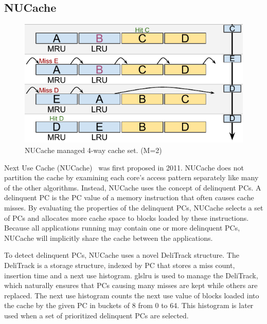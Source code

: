 
\subsection{NUCache}
\label{sec:algorithms:nucache}

\begin{figure}[ht]
    \centering
    \includegraphics[width=.65\textwidth]{figures/algorithms/NUCache}
    \caption[NUCache managed 4-way cache set.]{NUCache managed 4-way cache set. (M=2)}
    \label{fig:algorithms:nucache_example}
\end{figure}

Next Use Cache (NUCache)~\cite{Manikantan2011} was first proposed in 2011.
NUCache does not partition the cache by examining each core's access pattern separately like many of the other algorithms. 
Instead, NUCache uses the concept of delinquent PCs.
A delinquent PC is the PC value of a memory instruction that often causes cache misses.
By evaluating the properties of the delinquent PCs, NUCache selects a set of PCs and allocates more cache space to blocks loaded by these instructions.
Because all applications running may contain one or more delinquent PCs, NUCache will implicitly share the cache between the applications.

To detect delinquent PCs, NUCache uses a novel DeliTrack structure.
The DeliTrack is a storage structure, indexed by PC that stores a miss count, insertion time and a next use histogram. 
gls{lru} is used to manage the DeliTrack, which naturally ensures that PCs causing many misses are kept while others are replaced.
The next use histogram counts the next use value of blocks loaded into the cache by the given PC in buckets of 8 from 0 to 64.
This histogram is later used when a set of prioritized delinquent PCs are selected.

